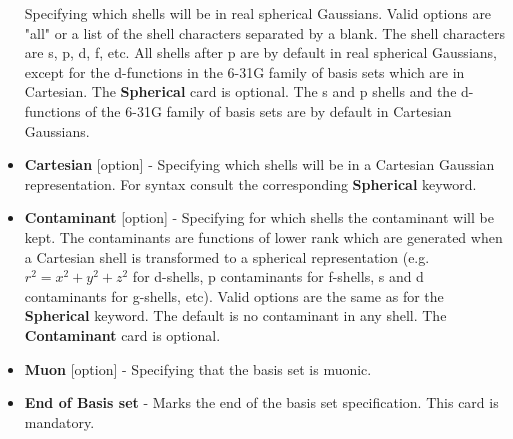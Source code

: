 \begin{keywordlist}
\begin{itemize}
Specifying which shells will be in real spherical Gaussians. Valid options
are "all" or a list of the shell characters separated by a blank. The
shell characters are s, p, d, f, etc. All shells after p are by
default in real spherical Gaussians, except for the d-functions in the
6-31G family of basis sets which are in Cartesian.
The {\bf Spherical} card is optional. The s and p shells and the d-functions of
the 6-31G family of basis sets are by default in Cartesian Gaussians.
%
\item {\bf Cartesian} [option] -{}
Specifying which shells will be in a Cartesian Gaussian representation. For syntax
consult the corresponding {\bf Spherical} keyword.
%
\item {\bf Contaminant} [option] -{}
Specifying for which shells the contaminant will be kept.
The contaminants are functions of lower rank which are generated
when a Cartesian shell is transformed to a spherical representation
(e.g. $r^2=x^2+y^2+z^2$ for d-{}shells, p contaminants for f-{}shells,
s and d contaminants for g-{}shells, etc).
Valid options are the same as for the {\bf Spherical} keyword.
The default is no contaminant in any shell. The {\bf Contaminant} card is optional.
%
\item {\bf Muon} [option] -{}
Specifying that the basis set is muonic.
%
\item {\bf End of Basis set} -{}
Marks the end of the basis set specification.
This card is mandatory.
\end{itemize}

\end{keywordlist}

